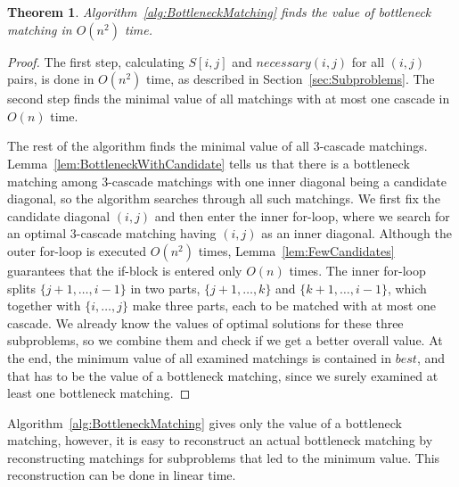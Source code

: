 \documentclass[a4paper, 11pt]{article}
\newtheorem{theorem}{Theorem}
\newcommand{\p}[2]{\{#1, \ldots, #2\}}
\newcommand{\pij}{\p{i}{j}}
\begin{document}
\begin{theorem}
	Algorithm~\ref{alg:BottleneckMatching} finds the value of bottleneck matching in $O(n^2)$ time.
\end{theorem}
\begin{proof}
	The first step, calculating $S[i,j]$ and $necessary(i,j)$ for all $(i,j)$ pairs, is done in $O(n^2)$ time, as described in Section~\ref{sec:Subproblems}. The second step finds the minimal value of all matchings with at most one cascade in $O(n)$ time.

	The rest of the algorithm finds the minimal value of all $3$-cascade matchings. Lemma~\ref{lem:BottleneckWithCandidate} tells us that there is a bottleneck matching among $3$-cascade matchings with one inner diagonal being a candidate diagonal, so the algorithm searches through all such matchings. We first fix the candidate diagonal $(i,j)$ and then enter the inner for-loop, where we search for an optimal $3$-cascade matching having $(i,j)$ as an inner diagonal. Although the outer for-loop is executed $O(n^2)$ times, Lemma~\ref{lem:FewCandidates} guarantees that the if-block is entered only $O(n)$ times. The inner for-loop splits $\p{j+1}{i-1}$ in two parts, $\p{j+1}{k}$ and $\p{k+1}{i-1}$, which together with $\pij$ make three parts, each to be matched with at most one cascade. We already know the values of optimal solutions for these three subproblems, so we combine them and check if we get a better overall value. At the end, the minimum value of all examined matchings is contained in $best$, and that has to be the value of a bottleneck matching, since we surely examined at least one bottleneck matching.
\end{proof}

Algorithm~\ref{alg:BottleneckMatching} gives only the value of a bottleneck matching, however, it is easy to reconstruct an actual bottleneck matching by reconstructing matchings for subproblems that led to the minimum value. This reconstruction can be done in linear time.




\end{document}
